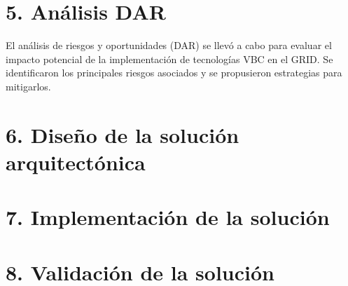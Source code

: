 \section*{5. Análisis DAR}
El análisis de riesgos y oportunidades (DAR) se llevó a cabo para evaluar el impacto potencial de la implementación de tecnologías VBC en el GRID. Se identificaron los principales riesgos asociados y se propusieron estrategias para mitigarlos.

\section*{6. Diseño de la solución arquitectónica}

\section*{7. Implementación de la solución}

\section*{8. Validación de la solución}

